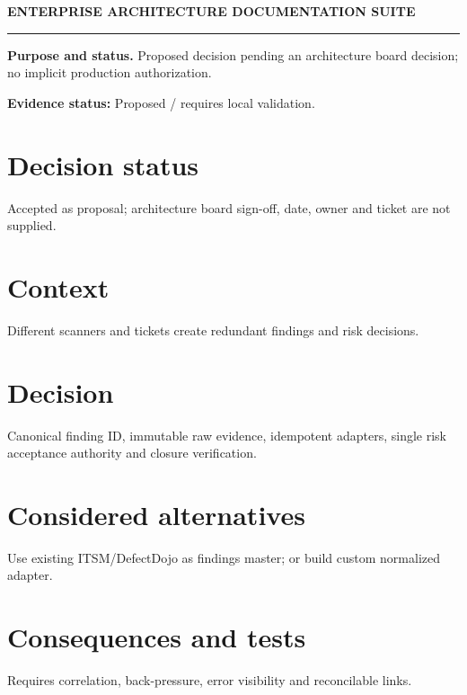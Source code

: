 \documentclass[10pt,letterpaper]{article}
\begin{document}
\begin{center}
{\large\bfseries\color{teal} ENTERPRISE ARCHITECTURE DOCUMENTATION SUITE}\par
{}\par
{}\par
\end{center}
\vspace{8pt}\hrule\vspace{12pt}
\textbf{Purpose and status.} Proposed decision pending an architecture board decision; no implicit production authorization.\par
\textbf{Evidence status:} Proposed / requires local validation.\par
\section{Decision status}
Accepted as proposal; architecture board sign-off, date, owner and ticket are not supplied.\par
\section{Context}
Different scanners and tickets create redundant findings and risk decisions.\par
\section{Decision}
Canonical finding ID, immutable raw evidence, idempotent adapters, single risk acceptance authority and closure verification.\par
\section{Considered alternatives}
Use existing ITSM/DefectDojo as findings master; or build custom normalized adapter.\par
\section{Consequences and tests}
Requires correlation, back-pressure, error visibility and reconcilable links.\par
\end{document}
